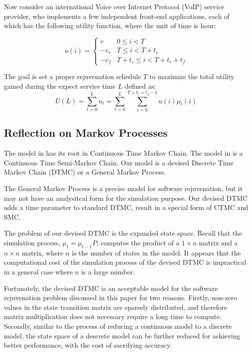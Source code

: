 Now consider an international Voice over Internet Protocol (VoIP) service 
provider, who implements a few independent front-end applications, each of 
which has the following utility function, where the unit of time is hour:

\begin{equation}
\label{discrete_benifit_utiliy}
u(i) =  \begin{cases}     r & 0 \leq i < T \\
                       -c_r & T \leq i < T + t_r \\
                       -c_f & T + t_r \leq i < T + t_r + t_f
        \end{cases}
\end{equation}

The goal is set a proper rejuvenation schedule $T$ to maximize the total 
utility gained during the expect service time $L$ defined as: 
\begin{equation}
\label{discrete_benifi_total}
U(L) = \sum \limits_{t=0}^{L} u_t = \sum \limits_{t=0}^{L}  \sum 
\limits_{i=0}^{T+t_r+t_f-1} u(i)\mu_t(i)
\end{equation}


\subsection{Reflection on Markov Processes}

The model in \citep{huang1995software} has its root in Continuous Time Markov 
Chain.  The model in \citep{dohi2000statistical} is a Continuous Time 
Semi-Markov Chain. Our model is a devised Discrete Time Markov Chain (DTMC) or 
a General Markov Process.

The General Markov Process is a precise model for software rejuvenation, but it 
may not have an analysitcal form for the simulation purpose.  Our devised 
DTMC adds a time parameter to standard DTMC, result in a special form of CTMC 
and SMC.

The problem of our devised DTMC is the expanded state space. Recall that the 
simulation process, $\mu_t = \mu_{t-1} P$, computes the product of a $1 \times 
n$ matrix and a $n \times n$ matrix, where $n$ is the number of states in the 
model.  It appears that the computational cost of the simulation 
process of the devised DTMC is impractical in a general case where $n$ is a 
large number.

Fortunately, the devised DTMC is an acceptable model for the software 
rejuvenation problem discussed in this paper for two reasons.  Firstly, 
non-zero values in the state transition matrix are sparsely distributed, and 
therefore matrix multiplication does not necessary require a long time to 
compute.   Secondly, similar to the process of reducing a continuous model to a 
discrete model, the state space of a descrete model can be further reduced for 
achieving better performance, with the cost of sacrifying accuracy.